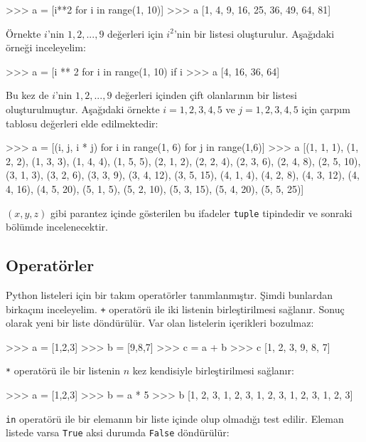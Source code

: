 \documentclass[12pt]{report}
\begin{document}
\begin{python}
>>> a = [i**2 for i in range(1, 10)]
>>> a
[1, 4, 9, 16, 25, 36, 49, 64, 81]
\end{python}

Örnekte $i$'nin $1,2,...,9$ değerleri için $i^2$'nin bir listesi oluşturulur. Aşağıdaki örneği inceleyelim:

\begin{python}
>>> a = [i ** 2 for i in range(1, 10) if i %
>>> a
[4, 16, 36, 64]
\end{python}

Bu kez de $i$'nin $1,2,...,9$ değerleri içinden çift olanlarının bir listesi oluşturulmuştur. Aşağıdaki örnekte $i = 1, 2, 3, 4, 5$ ve $j = 1, 2, 3, 4, 5$ için çarpım tablosu değerleri elde edilmektedir:

\begin{python}
>>> a = [(i, j,  i * j) for i in range(1, 6) for j in range(1,6)]
>>> a
[(1, 1, 1), (1, 2, 2), (1, 3, 3), (1, 4, 4), (1, 5, 5), (2, 1, 2), (2, 2, 4), (2, 3, 6), (2, 4, 8), (2, 5, 10), (3, 1, 3), (3, 2, 6), (3, 3, 9), (3, 4, 12), (3, 5, 15), (4, 1, 4), (4, 2, 8), (4, 3, 12), (4, 4, 16), (4, 5, 20), (5, 1, 5), (5, 2, 10), (5, 3, 15), (5, 4, 20), (5, 5, 25)]
\end{python}

$(x, y, z)$ gibi parantez içinde gösterilen bu ifadeler \texttt{tuple} tipindedir ve sonraki bölümde incelenecektir. 

\subsection{Operatörler}
Python listeleri için bir takım operatörler tanımlanmıştır. Şimdi bunlardan birkaçını inceleyelim. \texttt{+} operatörü ile iki listenin birleştirilmesi sağlanır. Sonuç olarak yeni bir liste döndürülür. Var olan listelerin içerikleri bozulmaz:

\begin{python}
>>> a = [1,2,3]
>>> b = [9,8,7]
>>> c = a + b
>>> c
[1, 2, 3, 9, 8, 7]
\end{python}

\texttt{*} operatörü ile bir listenin $n$ kez kendisiyle birleştirilmesi sağlanır:

\begin{python}
>>> a = [1,2,3]
>>> b = a * 5
>>> b
[1, 2, 3, 1, 2, 3, 1, 2, 3, 1, 2, 3, 1, 2, 3]
\end{python}

\texttt{in} operatörü ile bir elemanın bir liste içinde olup olmadığı test edilir. Eleman listede varsa \texttt{True} aksi durumda \texttt{False} döndürülür:
\end{document}
